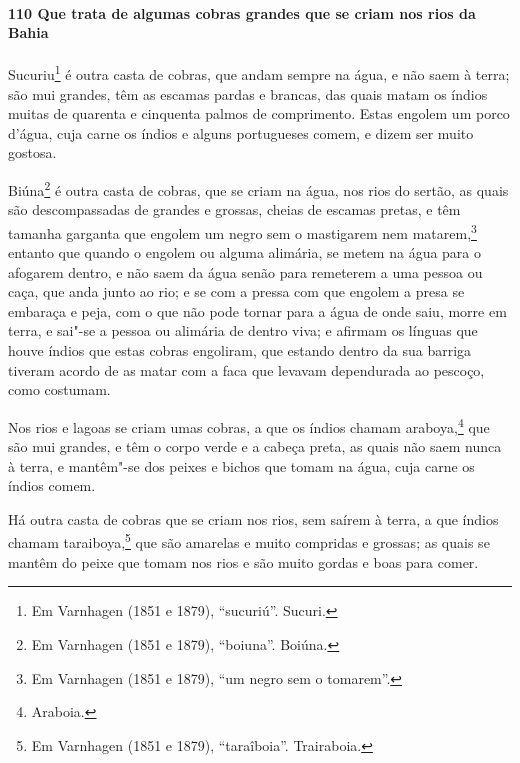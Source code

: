 \begin{linenumbers}
\paragraph{110 Que trata de algumas cobras grandes que se criam nos rios da Bahia}\quad
Sucuriu\footnote{ Em Varnhagen (1851 e 1879), ``sucuriú''. Sucuri.} é outra casta de
cobras, que andam sempre na água, e não saem à terra; são mui grandes, têm as escamas
pardas e brancas, das quais matam os índios muitas de quarenta e cinquenta palmos de
comprimento. Estas engolem um porco d'água, cuja carne os índios e alguns portugueses
comem, e dizem ser muito gostosa.

Biúna\footnote{ Em Varnhagen (1851 e 1879), ``boiuna''. Boiúna.} é outra casta de cobras,
que se criam na água, nos rios do sertão, as quais são descompassadas de grandes e
grossas, cheias de escamas pretas, e têm tamanha garganta que engolem um negro sem o
mastigarem nem matarem,\footnote{ Em Varnhagen (1851 e 1879), ``um negro sem o
tomarem''.} entanto que quando o engolem ou alguma alimária, se metem na água para o
afogarem dentro, e não saem da água senão para remeterem a uma pessoa ou caça, que anda
junto ao rio; e se com a pressa com que engolem a presa se embaraça e peja, com o que não
pode tornar para a água de onde saiu, morre em terra, e sai"-se a pessoa ou alimária de
dentro viva; e afirmam os línguas que houve índios que estas cobras engoliram, que estando
dentro da sua barriga tiveram acordo de as matar com a faca que levavam dependurada ao
pescoço, como costumam.

Nos rios e lagoas se criam umas cobras, a que os índios chamam araboya,\footnote{
Araboia.} que são mui grandes, e têm o corpo verde e a cabeça preta, as quais não saem
nunca à terra, e mantêm"-se dos peixes e bichos que tomam na água, cuja carne os índios
comem.

Há outra casta de cobras que se criam nos rios, sem saírem à terra, a que índios chamam
taraiboya,\footnote{ Em Varnhagen (1851 e 1879), ``taraîboia''. Trairaboia.} que são
amarelas e muito compridas e grossas; as quais se mantêm do peixe que tomam nos rios e são
muito gordas e boas para comer.


\end{linenumbers}
